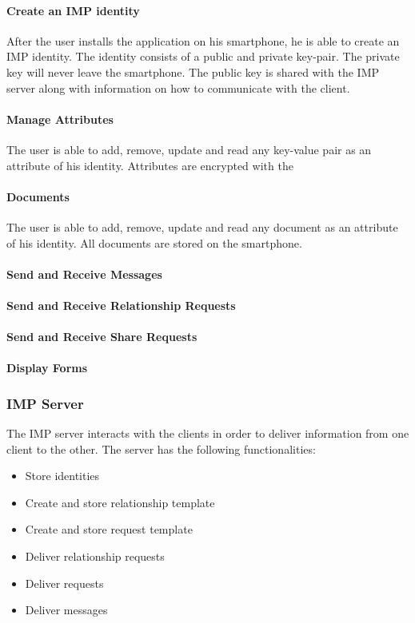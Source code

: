 \documentclass[
     12pt,         %
     a4paper,      %
     BCOR=10mm,version=first,     %
     DIV=14,version=first,        %
     ]{scrreprt}
\begin{document}
\paragraph{Create an IMP identity}

After the user installs the application on his smartphone, he is able to create an IMP identity. The identity consists of a public and private key-pair. The private key will never leave the smartphone. The public key is shared with the IMP server along with information on how to communicate with the client.

\paragraph{Manage Attributes}

The user is able to add, remove, update and read any key-value pair as an attribute of his identity. Attributes are encrypted with the 

\paragraph{Documents}

The user is able to add, remove, update and read any document as an attribute of his identity. All documents are stored on the smartphone. 

\paragraph{Send and Receive Messages}
\paragraph{Send and Receive Relationship Requests}
\paragraph{Send and Receive Share Requests}
\paragraph{Display Forms}

\subsubsection{IMP Server}
The IMP server interacts with the clients in order to deliver information from one client to the other. The server has the following functionalities:
\begin{itemize}
    \item Store identities
    \item Create and store relationship template
    \item Create and store request template
    \item Deliver relationship requests
    \item Deliver requests
    \item Deliver messages
\end{itemize}
\end{document}
